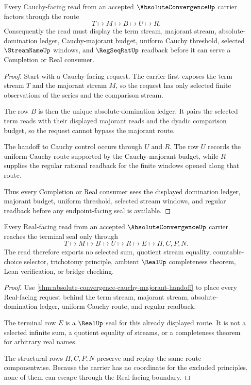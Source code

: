 
\begin{theorem}\label{thm:absolute-convergence-cauchy-majorant-handoff}
Every Cauchy-facing read from an accepted $\AbsoluteConvergenceUp$ carrier factors through the route
$$
T \longmapsto M \longmapsto B \longmapsto U \longmapsto R .
$$
Consequently the read must display the term stream, majorant stream, absolute-domination ledger, Cauchy-majorant budget, uniform Cauchy threshold, selected $\StreamNameUp$ windows, and $\RegSeqRatUp$ readback before it can serve a Completion or Real consumer.
\end{theorem}
\begin{proof}
Start with a Cauchy-facing request. The carrier first exposes the term stream $T$ and the majorant stream $M$, so the request has only selected finite observations of the series and the comparison stream.

The row $B$ is then the unique absolute-domination ledger. It pairs the selected term reads with their displayed majorant reads and the dyadic comparison budget, so the request cannot bypass the majorant route.

The handoff to Cauchy control occurs through $U$ and $R$. The row $U$ records the uniform Cauchy route supported by the Cauchy-majorant budget, while $R$ supplies the regular rational readback for the finite windows opened along that route.

Thus every Completion or Real consumer sees the displayed domination ledger, majorant budget, uniform threshold, selected stream windows, and regular readback before any endpoint-facing seal is available.
\end{proof}

\begin{theorem}\label{thm:absolute-convergence-real-seal-nonescape}
Every Real-facing read from an accepted $\AbsoluteConvergenceUp$ carrier reaches the terminal seal only through
$$
T \longmapsto M \longmapsto B \longmapsto U \longmapsto R \longmapsto E \longmapsto H,C,P,N .
$$
The read therefore exports no selected sum, quotient stream equality, countable-choice selector, trichotomy principle, ambient $\RealUp$ completeness theorem, Lean verification, or bridge checking.
\end{theorem}
\begin{proof}
Use \autoref{thm:absolute-convergence-cauchy-majorant-handoff} to place every Real-facing request behind the term stream, majorant stream, absolute-domination ledger, uniform Cauchy route, and regular readback.

The terminal row $E$ is a $\RealUp$ seal for this already displayed route. It is not a selected infinite sum, a quotient equality of streams, or a completeness theorem for arbitrary real names.

The structural rows $H,C,P,N$ preserve and replay the same route componentwise. Because the carrier has no coordinate for the excluded principles, none of them can escape through the Real-facing boundary.
\end{proof}

